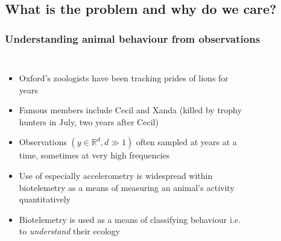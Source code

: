 \documentclass[aspectratio=169]{beamer}
\begin{document}
\begin{frame}[plain]
\subsection{What is the problem and why do we care?}
\frametitle{Understanding animal behaviour from observations} 
\begin{columns}[t] %


\begin{itemize}
    \small
    \item Oxford's zoologists have been tracking prides of lions for years 
    \item Famous members include Cecil and Xanda (killed by trophy hunters in July, two years after Cecil)
    \item Observations $(y \in \mathbb{R}^d, d\gg1)$ often sampled at years at a time, sometimes at very high frequencies 
    \item Use of especially accelerometry is widespread within biotelemetry as a means of measuring an animal’s activity quantitatively
    \item Biotelemetry is used as a means of classifying behaviour i.e. to \emph{understand} their ecology
\end{itemize}

\vspace{-2em}
\begin{figure}[ht]
    \\[-0em]
\end{figure}
\end{columns}
\end{frame}
\end{document}
